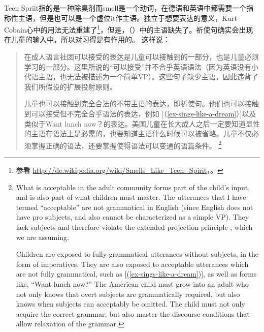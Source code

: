 \z
Teen Spriit指的是一种除臭剂而smell是一个动词，在德语和英语中都需要一个指称性主语，但是也可以是一个虚位it作主语。独立于想要表达的意义，Kurt Cobain心中的用法无法重建了\footnote{%
 参看 \url{http://de.wikipedia.org/wiki/Smells_Like_Teen_Spirit}，。
}，但是，（）中的主语缺失了。祈使句确实会出现在儿童的输入中，所以对习得是有作用的。 \citet[]{Valian91a}这样说：
\begin{quotation}
在成人语言社团可以接受的表达是儿童可以接触到的一部分，也是儿童必须学习的一部分。这里所说的“可以接受”并不合乎英语语法（因为英语没有小代语主语，也无法被描述为一个简单VP）。这些句子缺少主语，因此违背了我们所假设的扩展投射原则\citep{Chomsky81a}。

儿童也可以接触到完全合法的不带主语的表达，即祈使句。他们也可以接触到可以接受但不完全合乎语法的表达，例如 [（\ref{ex-sings-like-a-dream}）]以及类似于Want lunch now？的表达。美国儿童在长大成人之后一定要知道显性的主语在语法上是必需的，也要知道主语什么时候可以被省略。儿童不仅必须掌握正确的语法，还要掌握使得语法可以变通的语篇条件。 \citep[]{Valian91a}\footnote{%
What is acceptable in the adult community forms part of the child's input, and
is also part of what children must master. The utterances that I have termed
``acceptable'' are not grammatical in English (since English does not have pro
subjects, and also cannot be characterized as a simple VP). They lack subjects
and therefore violate the extended projection principle \citep{Chomsky81a}, which we are assuming.

   Children are exposed to fully grammatical utterances without subjects, in the
form of imperatives. They are also exposed to acceptable utterances which are
not fully grammatical, such as [(\ref{ex-sings-like-a-dream})], as well as forms like, ``Want lunch now?'' The
American child must grow into an adult who not only knows that overt subjects
are grammatically required, but also knows when subjects can acceptably be
omitted. The child must not only acquire the correct grammar, but also master
the discourse conditions that allow relaxation of the grammar.}
\end{quotation}
